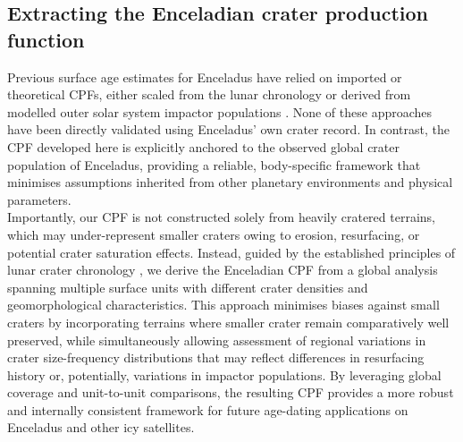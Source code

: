 \documentclass[preprint,11pt,3p,times,authoryear]{elsarticle}
\begin{document}
\subsection{Extracting the Enceladian crater production function} 
Previous surface age estimates for Enceladus have relied on imported or theoretical CPFs, either scaled from the lunar chronology \citep{Spencer2006} or derived from modelled outer solar system impactor populations \citep{Kirchoff2009,Wong2023,Bottke2024}. None of these approaches have been directly validated using Enceladus' own crater record. In contrast, the CPF developed here is explicitly anchored to the observed global crater population of Enceladus, providing a reliable, body-specific framework that minimises assumptions inherited from other planetary environments and physical parameters.\\

Importantly, our CPF is not constructed solely from heavily cratered terrains, which may under-represent smaller craters owing to erosion, resurfacing, or potential crater saturation effects. Instead, guided by the established principles of lunar crater chronology \citep{Neukum1983}, we derive the Enceladian CPF from a global analysis spanning multiple surface units with different crater densities and geomorphological characteristics. This approach minimises biases against small craters by incorporating terrains where smaller crater remain comparatively well preserved, while simultaneously allowing assessment of regional variations in crater size-frequency distributions that may reflect differences in resurfacing history or, potentially, variations in impactor populations. By leveraging global coverage and unit-to-unit comparisons, the resulting CPF provides a more robust and internally consistent framework for future age-dating applications on Enceladus and other icy satellites.

\end{document}
